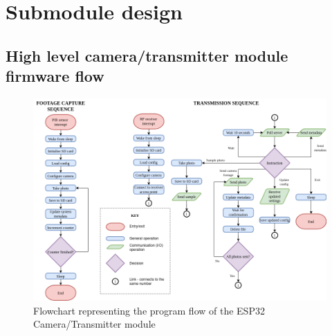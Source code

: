 \documentclass[class=report,11pt,crop=false]{standalone}
\begin{document}





\section{Submodule design} \label{s:firmware-design-process}

\subsection{High level camera/transmitter module firmware flow}

\begin{figure}[ht]
    \centering
    \includegraphics[width=\columnwidth]{"Images/ESP-flow.png"}
    \caption{Flowchart representing the program flow of the ESP32 Camera/Transmitter module}
    \label{fig:espflow}
\end{figure}
\end{document}
